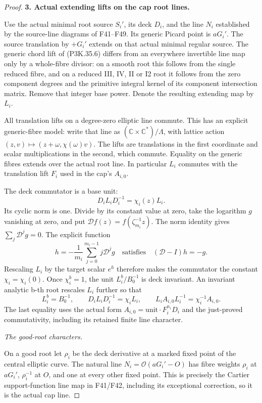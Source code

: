 \begin{proof}
\par\medskip\noindent\textbf{3. Actual extending lifts on the cap root lines.}\enspace

Use the actual minimal root source \(S_i'\), its deck \(D_i\), and
the line \(N_i\) established by the source-line diagrams of F41--F49.
Its generic Picard point is \(aG_i'\). The source translation by
\(+G_i'\) extends on that actual minimal regular source. The generic
chord lift of (P3K.35.6) differs from an everywhere invertible line map
only by a whole-fibre divisor: on a smooth root this follows from
the single reduced fibre, and on a reduced III, IV, II or I2 root
it follows from the zero component degrees and the primitive integral
kernel of its component intersection matrix. Remove that integer
base power. Denote the resulting extending map by \(L_i\).

All translation lifts on a degree-zero elliptic line commute. This
has an explicit generic-fibre model: write that line as
\((\mathbb C\times\mathbb C^*)/\Lambda\), with lattice action
\((z,v)\mapsto(z+\omega,\chi(\omega)v)\). The lifts are translations
in the first coordinate and scalar multiplications in the second,
which commute. Equality on the generic fibres extends over the actual
root line. In particular \(L_i\) commutes with the translation lift
\(F_i\) used in the cap's \(A_{i,0}\).

The deck commutator is a base unit:
\[
                      D_iL_iD_i^{-1}=\chi_i(z)L_i.
\]
Its cyclic norm is one. Divide by its constant value at zero, take
the logarithm \(g\) vanishing at zero, and put
\(\mathcal D f(z)=f(\zeta_{m_i}^{-1}z)\). The norm identity
gives \(\sum_j\mathcal D^jg=0\). The explicit function
\[
 h=-\frac1{m_i}\sum_{j=0}^{m_i-1}j\mathcal D^jg
 \quad\text{satisfies}\quad (\mathcal D-I)h=-g.
\]
Rescaling \(L_i\) by the target scalar \(e^h\) therefore makes
the commutator the constant
\(\chi_i=\chi_i(0)\). Once \(\chi_i^b=1\), the unit
\(L_i^b/B_0^{-1}\) is deck invariant. An invariant analytic b-th
root rescales \(L_i\) further so that
\[
 L_i^b=B_0^{-1},\qquad
 D_iL_iD_i^{-1}=\chi_i L_i,
 \qquad L_iA_{i,0}L_i^{-1}=\chi_i^{-1}A_{i,0}.          \tag{P3K.35.9}
\]
The last equality uses the actual form \(A_{i,0}=\text{unit}\cdot
F_i^{n_i}D_i\) and the just-proved commutativity, including its
retained finite line character.

\par\smallskip\noindent\textit{The good-root characters.}\enspace

On a good root let \(\rho_i\) be the deck derivative at a marked
fixed point of the central elliptic curve. The natural line
\(N_i=\mathcal O(aG_i'-O)\) has fibre weights \(\rho_i\) at
\(aG_i'\), \(\rho_i^{-1}\) at \(O\), and one at every other
fixed point. This is precisely the Cartier support-function line
map in F41/F42, including its exceptional correction, so it is
the actual cap line.


\end{proof}
